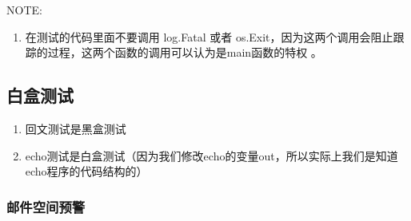 NOTE:

\begin{enumerate}
\tightlist
\item
  在测试的代码里面不要调用 log.Fatal 或者
  os.Exit，因为这两个调用会阻止跟踪的过程，这两个函数的调用可以认为是main函数的特权
  。
\end{enumerate}

\hypertarget{ux767dux76d2ux6d4bux8bd5}{%
\subsection{白盒测试}\label{ux767dux76d2ux6d4bux8bd5}}

\begin{enumerate}
\tightlist
\item
  回文测试是黑盒测试
\item
  echo测试是白盒测试（因为我们修改echo的变量out，所以实际上我们是知道echo程序的代码结构的）
\end{enumerate}

\hypertarget{ux90aeux4ef6ux7a7aux95f4ux9884ux8b66}{%
\subsubsection{邮件空间预警}\label{ux90aeux4ef6ux7a7aux95f4ux9884ux8b66}}

